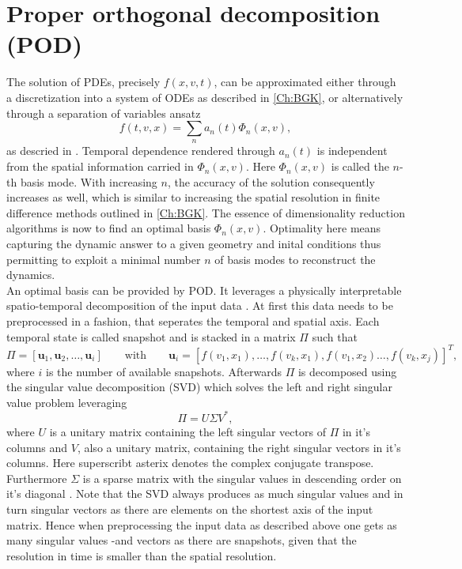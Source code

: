 \section{Proper orthogonal decomposition (POD)}
\label{Sec: POD}
The solution of PDEs, precisely \(f(x,v,t)\), can be approximated either through a discretization into a system of ODEs as described in \cref{Ch:BGK}, or alternatively through a separation of variables ansatz
\begin{equation}
	f(t,v,x) = \sum_n a_n(t)\Phi_n(x,v)\mathrm{,}
\end{equation}  
as descried in \cite{Kutz}. Temporal dependence rendered through \(a_n(t)\) is independent from the spatial information carried in \(\Phi_n(x,v)\). Here \(\Phi_n(x,v)\) is called the \(n\)-th basis mode. With increasing \(n\), the accuracy of the solution consequently increases as well, which is similar to increasing the spatial resolution in finite difference methods outlined in \cref{Ch:BGK}. The essence of dimensionality reduction algorithms is now to find an optimal basis \(\Phi_n(x,v)\). Optimality here means capturing the dynamic answer to a given geometry and inital conditions thus permitting to exploit a minimal number \(n\) of basis modes to reconstruct the dynamics.\\
An optimal basis can be provided by POD. It leverages a physically interpretable spatio-temporal decomposition of the input data \cite{Kutz}. At first this data needs to be preprocessed in a fashion, that seperates the temporal and spatial axis. Each temporal state is called snapshot and is stacked in a matrix \(\Pi\) such that
\begin{equation}
	\Pi=\left[ \mathbf{u}_1,\mathbf{u}_2,\dots,\mathbf{u}_i \right] \qquad \mathrm{with}\qquad \mathbf{u}_i=\left[f(v_1,x_1),\dots,f(v_k,x_1),f(v_1,x_2)\dots,f(v_k,x_j)\right]^T \mathrm{,}
\end{equation}
where \(i\) is the number of available snapshots. Afterwards \(\Pi\) is decomposed using the singular value decomposition (SVD) which solves the left and right singular value problem leveraging
\begin{equation}
\Pi = U\Sigma V^*\mathrm{,}
\end{equation}
where \(U\) is a unitary matrix containing the left singular vectors of \(\Pi\) in it's columns and \(V\), also a unitary matrix, containing the right singular vectors in it's columns. Here superscribt asterix denotes the complex conjugate transpose. Furthermore \(\Sigma\) is a sparse matrix with the singular values in descending order on it's diagonal \cite{Kutz}. Note that the SVD always produces as much singular values and in turn singular vectors as there are elements on the shortest axis of the input matrix. Hence when preprocessing the input data as described above one gets as many singular values -and vectors as there are snapshots, given that the resolution in time is smaller than the spatial resolution.\\
